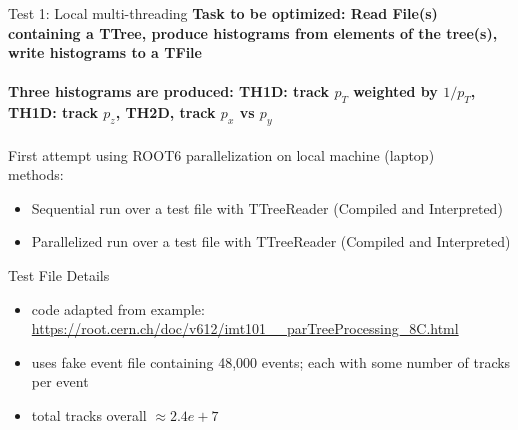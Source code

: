 \documentclass[10pt]{beamer}
\begin{document}
\begin{frame}{Test 1: Local multi-threading}
\textbf{Task to be optimized: Read File(s) containing a TTree, produce histograms from elements of the tree(s), write histograms to a TFile}\\
\quad \quad \\
\scriptsize
\textbf{ Three histograms are produced: TH1D: track $p_{T}$ weighted by $1/p_{T}$, TH1D: track $p_z$, TH2D, track $p_x$ vs $p_y$} \\
\normalsize
\quad \quad \\
First attempt using ROOT6 parallelization on local machine (laptop)\\
methods:\\
\begin{itemize}
\item Sequential run over a test file with TTreeReader (Compiled and Interpreted)
\item Parallelized run over a test file with TTreeReader (Compiled and Interpreted)
\end{itemize}

Test File Details\\
\begin{itemize}
\item code adapted from example: \url{https://root.cern.ch/doc/v612/imt101__parTreeProcessing_8C.html} 
\item uses fake event file containing 48,000 events; each with some number of tracks per event
\item total tracks overall $\approx 2.4e+7$ 
\end{itemize}

\end{frame}
\end{document}
